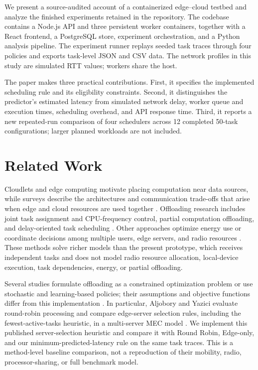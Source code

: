 \documentclass[conference]{IEEEtran}
\begin{document}
        We present a source-audited account of a containerized edge--cloud testbed and analyze the finished experiments retained in the repository. The codebase contains a Node.js API and three persistent worker containers, together with a React frontend, a PostgreSQL store, experiment orchestration, and a Python analysis pipeline. The experiment runner replays seeded task traces through four policies and exports task-level JSON and CSV data. The network profiles in this study are simulated RTT values; workers share the host.

        The paper makes three practical contributions. First, it specifies the implemented scheduling rule and its eligibility constraints. Second, it distinguishes the predictor's estimated latency from simulated network delay, worker queue and execution times, scheduling overhead, and API response time. Third, it reports a new repeated-run comparison of four schedulers across 12 completed 50-task configurations; larger planned workloads are not included.

    \section{Related Work}
    Cloudlets and edge computing motivate placing computation near data sources, while surveys describe the architectures and communication trade-offs that arise when edge and cloud resources are used together \cite{satya,shi,mach,mao_survey,wang_survey}. Offloading research includes joint task assignment and CPU-frequency control, partial computation offloading, and delay-oriented task scheduling \cite{dinh,wang_partial,liu_delay,ren_partial}. Other approaches optimize energy use or coordinate decisions among multiple users, edge servers, and radio resources \cite{you_energy,chen_multi,sardellitti}. These methods solve richer models than the present prototype, which receives independent tasks and does not model radio resource allocation, local-device execution, task dependencies, energy, or partial offloading.

    Several studies formulate offloading as a constrained optimization problem or use stochastic and learning-based policies; their assumptions and objective functions differ from this implementation \cite{zhou_markov,liu_qos,ma_offload}. In particular, Aljobory and Yazici evaluate round-robin processing and compare edge-server selection rules, including the fewest-active-tasks heuristic, in a multi-server MEC model \cite{ma_offload}. We implement this published server-selection heuristic and compare it with Round Robin, Edge-only, and our minimum-predicted-latency rule on the same task traces. This is a method-level baseline comparison, not a reproduction of their mobility, radio, processor-sharing, or full benchmark model.
\end{document}
